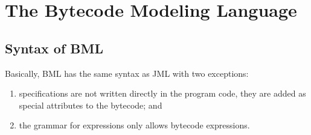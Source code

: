 \section{The Bytecode Modeling Language}
\label{SecBML}


\subsection{Syntax of BML}

Basically, BML has the same syntax as JML with two exceptions:
\begin{enumerate}
\item specifications are not written directly in the program code,
they are added as special attributes to the bytecode; and
\item the grammar for expressions only allows bytecode expressions.
\end{enumerate}

